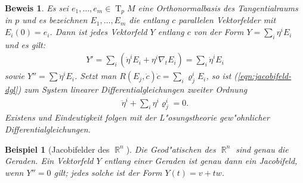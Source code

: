 \documentclass[paper=A4, twoside, chapterprefix=true, bibliography=totoc, headsepline]{scrbook}
\let\temp\phi{}
\let\phi\varphi{}
\let\varphi\temp{}
\let\temp\theta{}
\let\theta\vartheta{}
\let\vartheta\temp{}
\let\temp\epsilon{}
\let\epsilon\varepsilon{}
\let\varepsilon\temp{}
\let\temp\rho{}
\let\rho\varrho{}
\let\varrho\temp{}
\newcommand{\tikzgitter}[3][0.25]{
	\draw[step=#1,gray!15] #2 grid #3;
	\draw[step=2*#1,gray!30] #2 grid #3;
	\fill (0,0) circle(0.1); 
}
\DeclareMathOperator{\R}{\mathbb{R}}
\DeclareMathOperator{\T}{T}         %
\theoremstyle{plain}
\theoremstyle{nonumberplain}
\newtheorem{bsp}{Beispiel}
\newtheorem{bew}{Beweis}
\theoremstyle{empty}
\theoremstyle{break}
\begin{document}
\begin{bew}
  Es sei $e_1, \ldots, e_m \in \T_pM$ eine Orthonormalbasis des Tangentialraums in $p$ und es bezeichnen $E_1, \ldots, E_m$ die entlang $c$ parallelen Vektorfelder mit $E_i(0) = e_i$.
  Dann ist jedes Vektorfeld $Y$ entlang $c$ von der Form $Y = \sum_i \eta^iE_i$ und es gilt:
  \begin{align*}
    Y' = \sum_i (\dot \eta^i E_i + \eta^i\nabla_tE_i) = \sum_i \dot
    \eta^i E_i
  \end{align*}
  sowie $Y'' = \sum \ddot \eta^i E_i$.
  Setzt man $R(E_j,\dot c)\dot c = \sum_i\rho_j^i E_i$, so ist (\ref{eqn:jacobifeld-dgl}) zum System linearer Differentialgleichungen zweiter Ordnung
  \begin{align*}
    \ddot \eta^i + \sum_i \eta^i\rho_j^i = 0.
  \end{align*}
  Existens und Eindeutigkeit folgen mit der L"osungstheorie gew"ohnlicher Differentialgleichungen.
\end{bew}

\begin{bsp}[Jacobifelder des $\R^n$]
  Die Geod"atischen des $\R^n$ sind genau die Geraden.
  Ein Vektorfeld $Y$ entlang einer Geraden ist genau dann ein Jacobifeld, wenn $Y'' = 0$ gilt; jedes solche ist der Form $Y(t) = v + tw$.
  \begin{center}\end{center}
\end{bsp}
\end{document}
